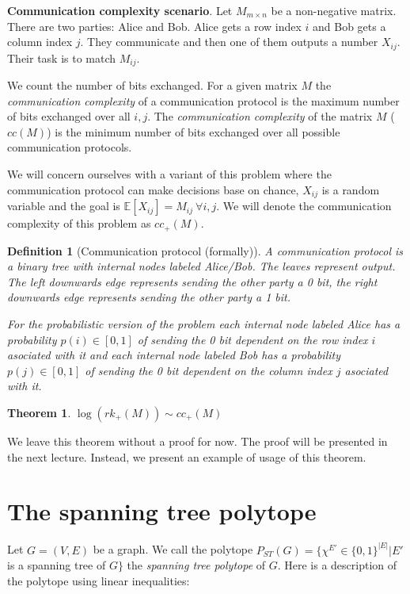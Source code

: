 \documentclass{article}
\newtheorem*{theorem}{Theorem}
\newtheorem*{definition}{Definition}
\begin{document}
\textbf{Communication complexity scenario}. Let $M_{m \times n}$ be a
non-negative matrix. There are two parties: Alice and Bob. Alice gets a row
index $i$ and Bob gets a column index $j$. They communicate and then one of
them outputs a number $X_{ij}$. Their task is to match $M_{ij}$.

We count the number of bits exchanged. For a given matrix $M$ the
\emph{communication complexity} of a communication protocol is the maximum
number of bits exchanged over all $i,j$. The \emph{communication complexity} of
the matrix $M$ ($cc(M)$) is the minimum number of bits exchanged over all
possible communication protocols.

We will concern ourselves with a variant of this problem where the
communication protocol can make decisions base on chance, $X_{ij}$ is a random
variable and the goal is $\mathbb{E}[X_{ij}] = M_{ij} ~\forall i,j$. We will
denote the communication complexity of this problem as $cc_+(M)$.

\begin{definition}[Communication protocol (formally)]
	A \emph{communication protocol} is a binary tree with internal nodes
	labeled Alice/Bob. The leaves represent output. The left downwards edge
	represents sending the other party a 0 bit, the right downwards edge
	represents sending the other party a 1 bit.

	For the probabilistic version of the problem each internal node labeled
	Alice has a probability $p(i) \in [0, 1]$ of sending the 0 bit
	dependent on the row index $i$ asociated with it and each internal node
	labeled Bob has a probability $p(j) \in [0, 1]$ of sending the 0 bit
	dependent on the column index $j$ asociated with it.
\end{definition}

\begin{theorem}
	$\log (rk_+(M)) \sim cc_+(M)$
\end{theorem}

We leave this theorem without a proof for now. The proof will be presented in
the next lecture. Instead, we present an example of usage of this theorem.


\section{The spanning tree polytope}

Let $G = (V, E)$ be a graph. We call the polytope $P_{ST}(G) = \{ \chi^{E'} \in
\{0, 1\}^{|E|} | E'$ is a spanning tree of $G \}$ the \emph{spanning tree
polytope} of $G$. Here is a description of the polytope using linear
inequalities:
\end{document}
